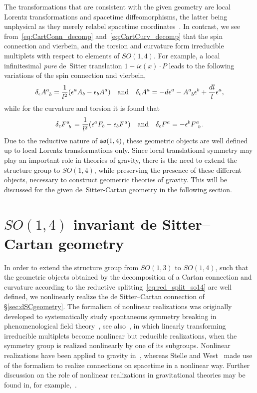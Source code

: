 \documentclass[
final,
11pt,
a4paper,
DIV=11,
headinclude=true,
footinclude=false,
bibliography=totoc,
twoside=true,  %
BCOR=5mm
]{scrbook}
\begin{document}
The transformations that are consistent with the given geometry 
are local Lorentz transformations and spacetime diffeomorphisms, 
the latter being unphysical as they merely relabel spacetime 
coordinates~\cite{Edelstein:2006a}. In contrast, we see 
from~\eqref{eq:CartConn_decomp} and~\eqref{eq:CartCurv_decomp} 
that the spin connection and vierbein, and the torsion and 
curvature form irreducible multiplets with respect to elements of 
$SO(1,4)$. For example, a local infinitesimal \emph{pure} 
de~Sitter translation $1 + i\epsilon(x)\cdot P$ leads to the 
following variations of the spin connection and vierbein,
\begin{equation}
\label{eq:infTransLinSpinVier_dS}
  \delta_\epsilon A\ind{^a_b} = \frac{1}{l^2}(\epsilon^a A_b 
  - \epsilon_b A^a)
  \quad\text{and}\quad
  \delta_\epsilon A^a = -d\epsilon^a - A\ind{^a_b}\epsilon^b 
  + \frac{dl}{l}\epsilon^a,
\end{equation}
while for the curvature and torsion it is found that 
\begin{equation*}
  \delta_\epsilon F\ind{^a_b} = \frac{1}{l^2}(\epsilon^a F_b 
  - \epsilon_b F^a)
  \quad\text{and}\quad
  \delta_\epsilon F^a = -\epsilon^b F\ind{^a_b}.
\end{equation*}
Due to the reductive nature of $\mathfrak{so}(1,4)$, these 
geometric objects are well defined up to local Lorentz 
transformations only. Since local translational symmetry may play 
an important role in theories of gravity, there is the need to 
extend the structure group to $SO(1,4)$, while preserving the 
presence of these different objects, necessary to construct 
geometric theories of gravity.  This will be discussed for the 
given de~Sitter-Cartan geometry in the following section.

\section{$SO(1,4)$ invariant de Sitter--Cartan geometry}
\label{sec:nonlindSCgeometry}

In order to extend the structure group from $SO(1,3)$ to 
$SO(1,4)$, such that the geometric objects obtained by the 
decomposition of a Cartan connection and curvature according to 
the reductive splitting~\eqref{eq:red_split_so14} are well 
defined, we nonlinearly realize the de Sitter--Cartan connection 
of \S\ref{sec:dSCgeometry}. The formalism of nonlinear 
realizations was originally developed to systematically study 
spontaneous symmetry breaking in phenomenological field 
theory~\cite{Coleman:1969sm, Callan:1969sn, Volkov:1973vd}, see 
also~\cite{Salam:1969rq}, in which linearly transforming 
irreducible multiplets become nonlinear but reducible 
realizations, when the symmetry group is realized nonlinearly by 
one of its subgroups. Nonlinear realizations have been applied to 
gravity in~\cite{Isham:1971dv, Borisov:1974bn}, whereas Stelle 
and West~\cite{Stelle:1979va, stelle.west:1980ds} made use of the 
formalism to realize connections on spacetime in a nonlinear way.  
Further discussion on the role of nonlinear realizations in 
gravitational theories may be found in, for 
example,~\cite{Wise:2011-sym.br, Tiemblo:2005js, 
  Tresguerres:2008jf, Hehl:2013gtg}.
\end{document}
